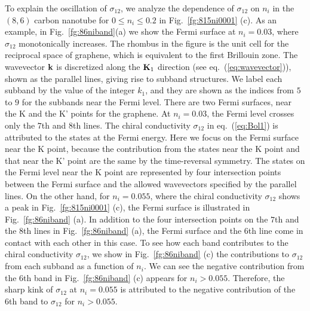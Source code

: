 \documentclass[journal=nalefd,manuscript=article,layout=twocolumn]{achemso}
\begin{document}
To explain the oscillation of $\sigma_{12}$, we analyze the dependence of $\sigma_{12}$ on $n_i$ in the $(8,6)$ carbon 
nanotube for $0\leq n_i\leq0.2$ in Fig.\ \ref{fg:815ni0001} (c). 
As an example, in Fig.\ \ref{fg:86niband}(a) we show the Fermi surface at $n_i=0.03$, where $\sigma_{12}$ monotonically 
increases. 
The rhombus in the figure is the unit cell for the reciprocal space of graphene, which is equivalent to the first Brillouin zone. 
The wavevector ${\bf k}$ is discretized along the ${\bf K}_1$ direction (see eq.~(\ref{eq:wavevector})), shown as the parallel lines, giving 
rise to subband structures.  We label each subband by the value of the integer $k_1$, 
and they are shown as the indices
from $5$ to $9$ for the subbands near the Fermi level. 
There are two Fermi surfaces, near the K and the K' points for the graphene. 
At $n_i=0.03$, 
the Fermi level crosses only the $7$th and $8$th lines. 
The chiral conductivity $\sigma_{12}$ in eq.~(\ref{eq:Bol1}) is attributed to the states at the Fermi energy.
Here we focus on the Fermi surface near the K point, because the contribution from the states near 
the K point and that near the K' point are the same by the time-reversal symmetry.
The states on the Fermi level near the K point are represented by four intersection points between the 
Fermi surface and the allowed wavevectors specified by the parallel lines. 
On the other hand, 
for  $n_i=0.055$, where the chiral conductivity $\sigma_{12}$ shows a peak in 
Fig.\ \ref{fg:815ni0001} (c), the Fermi surface is illustrated in Fig.\ \ref{fg:86niband} (a). 
In addition to the four intersection points on the $7$th and the $8$th lines in Fig.\ \ref{fg:86niband} (a), 
the Fermi surface and the $6$th line come in contact with each other in this case. 
To see how each band contributes to the chiral conductivity $\sigma_{12}$, 
we show in Fig.\ \ref{fg:86niband} (c) the contributions to $\sigma_{12}$ from each 
subband 
as a function of $n_i$. 
We can see the negative contribution from the 6th band in Fig.\ \ref{fg:86niband} (c)
appears for $n_i>0.055$. Therefore,  
the sharp kink of  $\sigma_{12}$ at $n_i=0.055$ is attributed to the negative contribution of the 6th band to $\sigma_{12}$ for $n_i>0.055$.
\end{document}
